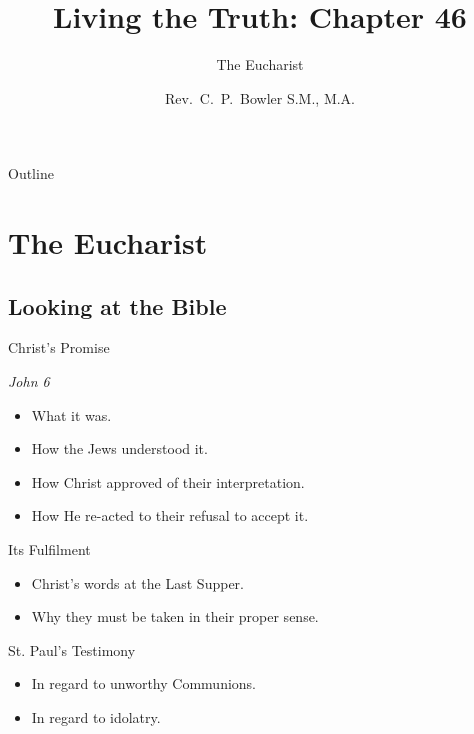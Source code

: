 \documentclass{beamer}
\title[Living the Truth 46] %
{Living the Truth: Chapter 46}
\subtitle
{The Eucharist} %
\author{Rev.~C.~P.~Bowler S.M., M.A.}
\begin{document}
\begin{frame}
  \titlepage
\end{frame}

\begin{frame}{Outline}
  \tableofcontents
\end{frame}




\section{The Eucharist}

\subsection{Looking at the Bible}

\begin{frame}{Christ's Promise}
\begin{center}
\emph{\huge John 6}
\end{center}
\begin{itemize}
\item What it was.
\item How the Jews understood it.
\item How Christ approved of their interpretation.
\item How He re-acted to their refusal to accept it.
\end{itemize}
\end{frame}

\begin{frame}{Its Fulfilment}
\begin{itemize}
\item Christ's words at the Last Supper.
\item Why they must be taken in their proper sense.
\end{itemize}
\end{frame}

\begin{frame}{St. Paul's Testimony}
\begin{itemize}
\item In regard to unworthy Communions.
\item In regard to idolatry.
\end{itemize}
\end{frame}
\end{document}
